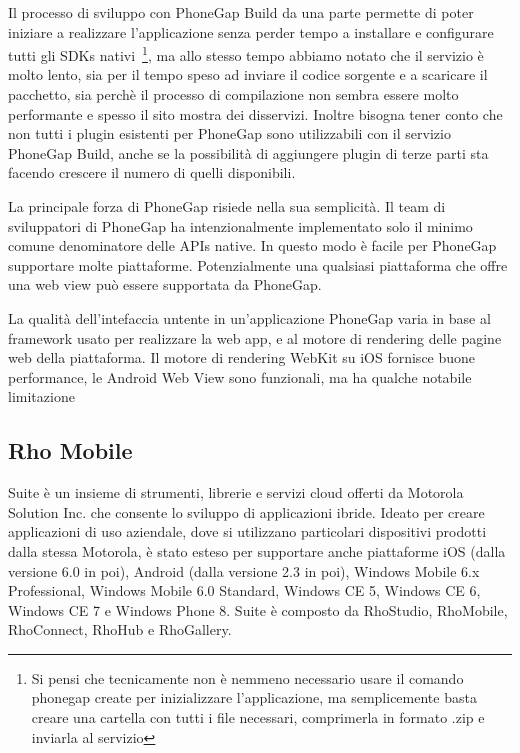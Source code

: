 			Il processo di sviluppo con PhoneGap Build da una parte permette di 
			poter iniziare a realizzare l'applicazione senza perder tempo a 
			installare e configurare tutti gli SDKs nativi~\footnote{Si pensi 
			che tecnicamente non è nemmeno necessario usare il comando 
			phonegap create per inizializzare l'applicazione, ma semplicemente 
			basta creare una cartella con tutti i file necessari, comprimerla 
			in formato .zip e inviarla al servizio}, ma allo stesso tempo 
			abbiamo notato che il servizio è molto lento, sia per il tempo speso  
			ad inviare il codice sorgente e a scaricare il pacchetto, sia perchè 
			il processo di compilazione non sembra essere molto performante e 
			spesso il sito mostra 
			dei disservizi. Inoltre bisogna tener conto che non tutti i plugin 
			esistenti per PhoneGap sono utilizzabili con il servizio 
			PhoneGap Build, anche se la possibilità di aggiungere plugin di terze 
			parti sta facendo crescere il numero di quelli disponibili.
			
			La principale forza di PhoneGap risiede nella sua semplicità. 
			Il team di sviluppatori di PhoneGap ha intenzionalmente implementato 
			solo il minimo comune denominatore delle APIs native. In questo modo 
			è facile per PhoneGap supportare molte piattaforme. Potenzialmente 
			una qualsiasi piattaforma che offre una web view può essere supportata 
			da PhoneGap.
			
			La qualità dell'intefaccia untente in un'applicazione PhoneGap 
			varia in base al framework usato per realizzare la web app, e al 
			motore di rendering delle pagine web della piattaforma.
			Il motore di rendering WebKit su iOS fornisce buone performance, le 
			Android Web View sono funzionali, ma ha qualche notabile 
			limitazione~\citep{Web:KevinSite}
			

		\subsection{Rho Mobile}
			\rhom{} Suite è un insieme di strumenti, librerie e servizi cloud
			offerti da Motorola Solution Inc. che consente lo sviluppo di
			applicazioni ibride. Ideato per creare applicazioni di uso aziendale,
			dove si utilizzano particolari dispositivi prodotti dalla stessa
			Motorola, è stato esteso per supportare anche piattaforme iOS
			(dalla versione 6.0 in poi), Android (dalla versione 2.3 in poi),
			Windows Mobile 6.x Professional, Windows Mobile 6.0 Standard,
			Windows CE 5, Windows CE 6, Windows CE 7 e Windows Phone 8.
			\rhom{} Suite è composto da RhoStudio, RhoMobile, RhoConnect,
			RhoHub e RhoGallery.
